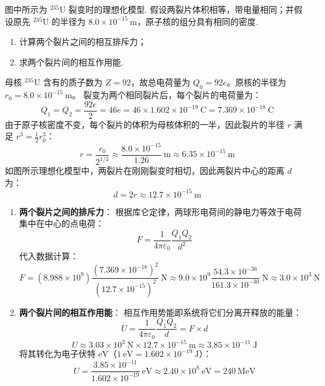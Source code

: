 \begin{exercise}\label{ex:15.11}
图中所示为 $^{235}\mathrm{U}$ 裂变时的理想化模型. 假设两裂片体积相等，带电量相同；并假设原先 $^{235}\mathrm{U}$ 的半径为 $8.0 \times 10^{-15} \ \mathrm{m}$，原子核的组分具有相同的密度. 
\begin{enumerate}
  \item[(a)] 计算两个裂片之间的相互排斥力；
  \item[(b)] 求两个裂片间的相互作用能.
\end{enumerate}
\begin{center}
\end{center}
\end{exercise}
\begin{solution}
母核 $^{235}\mathrm{U}$ 含有的质子数为 $Z = 92$，故总电荷量为 $Q_0 = 92e$。原核的半径为 $r_0 = 8.0 \times 10^{-15} \ \mathrm{m}$。
裂变为两个相同裂片后，每个裂片的电荷量为：
$$ Q_1 = Q_2 = \frac{92e}{2} = 46e = 46 \times 1.602 \times 10^{-19} \ \mathrm{C} = 7.369 \times 10^{-18} \ \mathrm{C} $$
由于原子核密度不变，每个裂片的体积为母核体积的一半，因此裂片的半径 $r$ 满足 $r^3 = \frac{1}{2}r_0^3$：
$$ r = \frac{r_0}{2^{1/3}} \approx \frac{8.0 \times 10^{-15}}{1.26} \ \mathrm{m} \approx 6.35 \times 10^{-15} \ \mathrm{m} $$
如图所示理想化模型中，两裂片在刚刚裂变时相切，因此两裂片中心的距离 $d$ 为：
$$ d = 2r \approx 12.7 \times 10^{-15} \ \mathrm{m} $$

\begin{enumerate}
  \item[(a)] \textbf{两个裂片之间的排斥力}：
  根据库仑定律，两球形电荷间的静电力等效于电荷集中在中心的点电荷：
  $$ F = \frac{1}{4\pi\varepsilon_0} \frac{Q_1 Q_2}{d^2} $$
  代入数据计算：
  $$ F = (8.988 \times 10^9) \frac{(7.369 \times 10^{-18})^2}{(12.7 \times 10^{-15})^2} \ \mathrm{N} \approx 9.0 \times 10^9 \frac{54.3 \times 10^{-36}}{161.3 \times 10^{-30}} \ \mathrm{N} \approx 3.0 \times 10^3 \ \mathrm{N} $$

  \item[(b)] \textbf{两个裂片间的相互作用能}：
  相互作用势能即系统将它们分离开释放的能量：
  $$ U = \frac{1}{4\pi\varepsilon_0} \frac{Q_1 Q_2}{d} = F \times d $$
  $$ U \approx 3.03 \times 10^3 \ \mathrm{N} \times 12.7 \times 10^{-15} \ \mathrm{m} \approx 3.85 \times 10^{-11} \ \mathrm{J} $$
  将其转化为电子伏特 $\mathrm{eV}$（$1 \ \mathrm{eV} = 1.602 \times 10^{-19} \ \mathrm{J}$）：
  $$ U = \frac{3.85 \times 10^{-11}}{1.602 \times 10^{-19}} \ \mathrm{eV} \approx 2.40 \times 10^8 \ \mathrm{eV} = 240 \ \mathrm{MeV} $$
\end{enumerate}
\end{solution}

